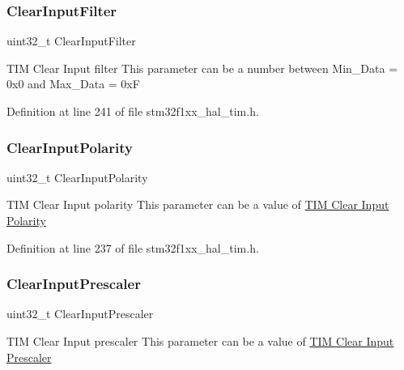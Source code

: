 \subsubsection{\texorpdfstring{Clear\+Input\+Filter}{ClearInputFilter}}
{\footnotesize\ttfamily uint32\+\_\+t Clear\+Input\+Filter}

T\+IM Clear Input filter This parameter can be a number between Min\+\_\+\+Data = 0x0 and Max\+\_\+\+Data = 0xF 

Definition at line 241 of file stm32f1xx\+\_\+hal\+\_\+tim.\+h.

\mbox{\label{struct_t_i_m___clear_input_config_type_def_a952f89c595fc06fe7e0ad41f8992fda2}} 
\subsubsection{\texorpdfstring{Clear\+Input\+Polarity}{ClearInputPolarity}}
{\footnotesize\ttfamily uint32\+\_\+t Clear\+Input\+Polarity}

T\+IM Clear Input polarity This parameter can be a value of \hyperlink{group___t_i_m___clear_input___polarity}{T\+IM Clear Input Polarity} 

Definition at line 237 of file stm32f1xx\+\_\+hal\+\_\+tim.\+h.

\mbox{\label{struct_t_i_m___clear_input_config_type_def_a177e485feed1a56dbb578aa11f758c79}} 
\subsubsection{\texorpdfstring{Clear\+Input\+Prescaler}{ClearInputPrescaler}}
{\footnotesize\ttfamily uint32\+\_\+t Clear\+Input\+Prescaler}

T\+IM Clear Input prescaler This parameter can be a value of \hyperlink{group___t_i_m___clear_input___prescaler}{T\+IM Clear Input Prescaler} 

